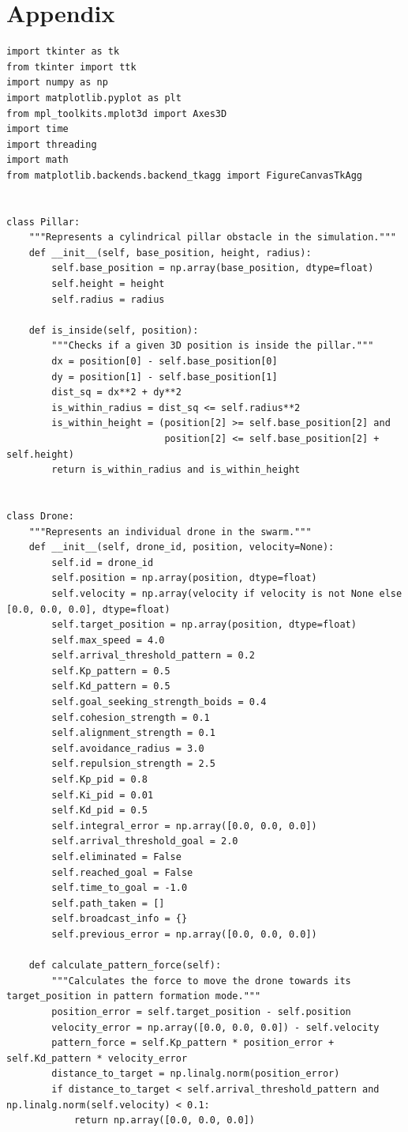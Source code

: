 \documentclass[11pt]{article}
\begin{document}
\section{Appendix}
\begin{lstlisting}[style=pythonstyle]
import tkinter as tk
from tkinter import ttk
import numpy as np
import matplotlib.pyplot as plt
from mpl_toolkits.mplot3d import Axes3D
import time
import threading
import math
from matplotlib.backends.backend_tkagg import FigureCanvasTkAgg


class Pillar:
    """Represents a cylindrical pillar obstacle in the simulation."""
    def __init__(self, base_position, height, radius):
        self.base_position = np.array(base_position, dtype=float)
        self.height = height
        self.radius = radius

    def is_inside(self, position):
        """Checks if a given 3D position is inside the pillar."""
        dx = position[0] - self.base_position[0]
        dy = position[1] - self.base_position[1]
        dist_sq = dx**2 + dy**2
        is_within_radius = dist_sq <= self.radius**2
        is_within_height = (position[2] >= self.base_position[2] and
                            position[2] <= self.base_position[2] + self.height)
        return is_within_radius and is_within_height


class Drone:
    """Represents an individual drone in the swarm."""
    def __init__(self, drone_id, position, velocity=None):
        self.id = drone_id
        self.position = np.array(position, dtype=float)
        self.velocity = np.array(velocity if velocity is not None else [0.0, 0.0, 0.0], dtype=float)
        self.target_position = np.array(position, dtype=float)
        self.max_speed = 4.0
        self.arrival_threshold_pattern = 0.2
        self.Kp_pattern = 0.5
        self.Kd_pattern = 0.5
        self.goal_seeking_strength_boids = 0.4
        self.cohesion_strength = 0.1
        self.alignment_strength = 0.1
        self.avoidance_radius = 3.0
        self.repulsion_strength = 2.5
        self.Kp_pid = 0.8
        self.Ki_pid = 0.01
        self.Kd_pid = 0.5
        self.integral_error = np.array([0.0, 0.0, 0.0])
        self.arrival_threshold_goal = 2.0
        self.eliminated = False
        self.reached_goal = False
        self.time_to_goal = -1.0
        self.path_taken = []
        self.broadcast_info = {}
        self.previous_error = np.array([0.0, 0.0, 0.0])

    def calculate_pattern_force(self):
        """Calculates the force to move the drone towards its target_position in pattern formation mode."""
        position_error = self.target_position - self.position
        velocity_error = np.array([0.0, 0.0, 0.0]) - self.velocity
        pattern_force = self.Kp_pattern * position_error + self.Kd_pattern * velocity_error
        distance_to_target = np.linalg.norm(position_error)
        if distance_to_target < self.arrival_threshold_pattern and np.linalg.norm(self.velocity) < 0.1:
            return np.array([0.0, 0.0, 0.0])


\end{lstlisting}
\end{document}
